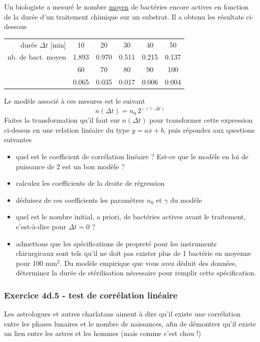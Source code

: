 \documentclass[main.tex]{subfiles}
\begin{document}
Un biologiste a mesuré le nombre \underline{moyen} de bactéries encore actives en fonction de la durée d'un traitement chimique sur un substrat. Il a obtenu les résultats ci-dessous
\begin{center}
    \begin{tabular}{r|ccccc}
        durée $\Delta t$ [min] & 10    & 20    & 30    & 40    & 50    \\
        nb. de bact. moyen     & 1.893 & 0.970 & 0.511 & 0.215 & 0.137 \\
                               & 60    & 70    & 80    & 90    & 100   \\
                               & 0.065 & 0.035 & 0.017 & 0.006 & 0.004
    \end{tabular}
\end{center}
Le modèle associé à ces mesures est le suivant
$$
    n(\Delta t)=n_0\,2^{-(\gamma\cdot\Delta t)}
$$
Faites la transformation qu'il faut sur $n(\Delta t)$ pour transformer cette expression ci-dessus en une relation linéaire du type $y=ax+b$, puis répondez aux questions suivantes
\begin{itemize}
    \item quel est le coefficient de corrélation linéaire ? Est-ce que le modèle en loi de puissance de 2 est un bon modèle ?
    \item calculez les coefficients de la droite de régression
    \item déduisez de ces coefficients les paramètres $n_0$ et $\gamma$ du modèle
    \item quel est le nombre initial, a priori, de bactéries actives avant le traitement, c'est-à-dire pour $\Delta t=0$ ?
    \item admettons que les spécifications de propreté pour les instruments chirurgicaux sont tels qu'il ne doit pas exister plus de 1 bactérie en moyenne pour 100 mm$^2$. Du modèle empirique que vous avez déduit des données, déterminez la durée de stérilisation nécessaire pour remplir cette spécification.
\end{itemize}

\subsubsection*{Exercice 4d.5 - test de corrélation linéaire}

Les astrologues et autres charlatans aiment à dire qu'il existe une corrélation entre les phases lunaires et le nombre de naissances, afin de démontrer qu'il existe un lien entre les astres et les hommes (mais comme c'est chou !)
\end{document}
